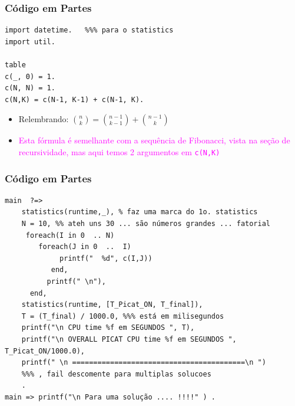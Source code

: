 \begin{frame}[fragile] 

\frametitle{Código em Partes}

\begin{footnotesize}
\begin{verbatim}
import datetime.   %%% para o statistics
import util.

table
c(_, 0) = 1.
c(N, N) = 1.
c(N,K) = c(N-1, K-1) + c(N-1, K).
\end{verbatim}
\end{footnotesize}    

\begin{itemize}
  \item Relembrando: ${n\choose k}={n-1\choose k-1}+{n-1\choose k}$

  \item \textcolor{magenta}{Esta fórmula é semelhante com a sequência de Fibonacci, vista
   na seção de recursividade, mas aqui temos 2 argumentos em \texttt{c(N,K)} }
  \end{itemize}

\end{frame}



\begin{frame}[fragile] 
\frametitle{Código em Partes}

\begin{footnotesize}
\begin{verbatim}
main  ?=>  
    statistics(runtime,_), % faz uma marca do 1o. statistics
    N = 10, %% ateh uns 30 ... são números grandes ... fatorial
     foreach(I in 0  .. N)
        foreach(J in 0  ..  I)
             printf("  %d", c(I,J))
           end,
          printf(" \n"),
      end, 
    statistics(runtime, [T_Picat_ON, T_final]),
    T = (T_final) / 1000.0, %%% está em milisegundos
    printf("\n CPU time %f em SEGUNDOS ", T),
    printf("\n OVERALL PICAT CPU time %f em SEGUNDOS ", T_Picat_ON/1000.0),
    printf(" \n =========================================\n ")
    %%% , fail descomente para multiplas solucoes
    .
main => printf("\n Para uma solução .... !!!!" ) .
\end{verbatim}
\end{footnotesize}
    
\end{frame}


